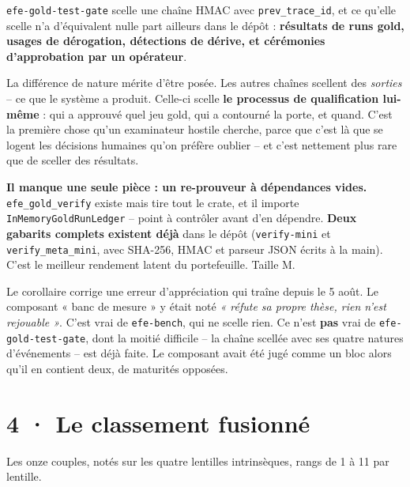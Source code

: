 \documentclass[10pt]{article}
\newcommand{\sz}[1]{{\small\color{grey}\textsf{#1}}}
\newcommand{\code}[1]{\texttt{\small #1}}
\begin{document}
\code{efe-gold-test-gate} scelle une chaîne HMAC avec \code{prev\_trace\_id}, et ce qu'elle scelle n'a
d'équivalent nulle part ailleurs dans le dépôt : \textbf{résultats de runs gold, usages de dérogation,
détections de dérive, et cérémonies d'approbation par un opérateur}.

La différence de nature mérite d'être posée. Les autres chaînes scellent des \emph{sorties} -- ce que le
système a produit. Celle-ci scelle \textbf{le processus de qualification lui-même} : qui a approuvé quel
jeu gold, qui a contourné la porte, et quand. C'est la première chose qu'un examinateur hostile cherche,
parce que c'est là que se logent les décisions humaines qu'on préfère oublier -- et c'est nettement plus
rare que de sceller des résultats.

\begin{piste}
\textbf{Il manque une seule pièce : un re-prouveur à dépendances vides.} \code{efe\_gold\_verify} existe
mais tire tout le crate, et il importe \code{InMemoryGoldRunLedger} -- point à contrôler avant d'en
dépendre. \textbf{Deux gabarits complets existent déjà} dans le dépôt (\code{verify-mini} et
\code{verify\_meta\_mini}, avec SHA-256, HMAC et parseur JSON écrits à la main). C'est le meilleur
rendement latent du portefeuille. \sz{Taille M.}
\end{piste}

Le corollaire corrige une erreur d'appréciation qui traîne depuis le 5 août. Le composant « banc de
mesure » y était noté \emph{« réfute sa propre thèse, rien n'est rejouable »}. C'est vrai de
\code{efe-bench}, qui ne scelle rien. Ce n'est \textbf{pas} vrai de \code{efe-gold-test-gate}, dont la
moitié difficile -- la chaîne scellée avec ses quatre natures d'événements -- est déjà faite. Le
composant avait été jugé comme un bloc alors qu'il en contient deux, de maturités opposées.

\section{4 · Le classement fusionné}

Les onze couples, notés sur les quatre lentilles intrinsèques, rangs de 1 à 11 par lentille.
\end{document}
